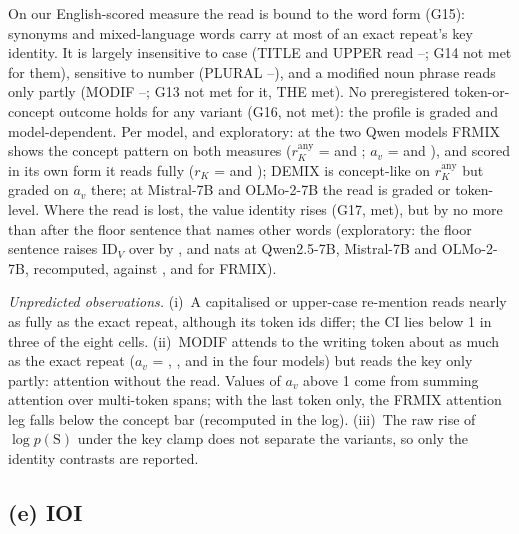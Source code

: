 On our English-scored measure the read is bound to the word form (G15): synonyms and mixed-language words carry at most \GfifteenRKMax{} of an exact repeat's key identity. It is largely insensitive to case (TITLE and UPPER read \GfourteenCaseMin{}--\GfourteenCaseMax{}; G14 not met for them), sensitive to number (PLURAL \GfourteenPluralMin{}--\GfourteenPluralMax{}), and a modified noun phrase reads only partly (MODIF \GthirteenModifMin{}--\GthirteenModifMax{}; G13 not met for it, THE met). No preregistered token-or-concept outcome holds for any variant (G16, not met): the profile is graded and model-dependent. Per model, and exploratory: at the two Qwen models FRMIX shows the concept pattern on both measures ($r_K^{\mathrm{any}}$ = \GdRKanyFrmixQwenSeven{} and \GdRKanyFrmixQwenFourteen{}; $a_v$ = \GdAvFrmixQwenSeven{} and \GdAvFrmixQwenFourteen{}), and scored in its own form it reads fully ($r_K$ = \GdRKformFrmixQwenSeven{} and \GdRKformFrmixQwenFourteen{}); DEMIX is concept-like on $r_K^{\mathrm{any}}$ but graded on $a_v$ there; at Mistral-7B and OLMo-2-7B the read is graded or token-level. Where the read is lost, the value identity rises (G17, met), but by no more than after the floor sentence that names other words (exploratory: the floor sentence raises $\mathrm{ID}_V$ over \fmtPost{} by \GdOtherCompQwenSeven{}, \GdOtherCompMistralSeven{} and \GdOtherCompOlmoSeven{} nats at Qwen2.5-7B, Mistral-7B and OLMo-2-7B, recomputed, against \GseventeenFrmixQwenSeven{}, \GseventeenFrmixMistralSeven{} and \GseventeenFrmixOlmoSeven{} for FRMIX).

\emph{Unpredicted observations.} (i)~A capitalised or upper-case re-mention reads nearly as fully as the exact repeat, although its token ids differ; the CI lies below 1 in three of the eight cells. (ii)~MODIF attends to the writing token about as much as the exact repeat ($a_v$ = \GdAvModifQwenSeven{}, \GdAvModifQwenFourteen{}, \GdAvModifMistralSeven{} and \GdAvModifOlmoSeven{} in the four models) but reads the key only partly: attention without the read. Values of $a_v$ above 1 come from summing attention over multi-token spans; with the last token only, the FRMIX attention leg falls below the concept bar (recomputed in the log). (iii)~The raw rise of $\log p(\mathrm{S})$ under the key clamp does not separate the variants, so only the identity contrasts are reported.

\subsection{(e) IOI}\label{app:g-ioi}

